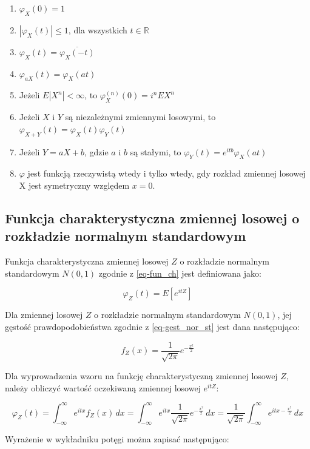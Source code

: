 \documentclass[
  letterpaper,
  DIV=11,
  numbers=noendperiod]{scrreprt}
\begin{document}
\begin{enumerate}
\def\labelenumi{\arabic{enumi}.}
\item
  \(\varphi_X(0) = 1\)
\item
  \(|\varphi_X(t)| \le 1\), dla wszystkich \(t \in \mathbb{R}\)
\item
  \(\varphi_X(t) = \overline{\varphi_X(-t)}\)
\item
  \(\varphi_{aX}(t) = \varphi_X(at)\)
\item
  Jeżeli \(E|X^n| < \infty\), to \(\varphi_{X}^{(n)}(0) = i^nEX^n\)
\item
  Jeżeli \(X\) i \(Y\) są niezależnymi zmiennymi losowymi, to
  \(\varphi_{X+Y}(t) =\varphi_X(t)\varphi_Y(t)\)
\item
  Jeżeli \(Y=aX+b\), gdzie \(a\) i \(b\) są stałymi, to
  \(\varphi_{Y}(t) =e^{itb}\varphi_X(at)\)
\item
  \(\varphi\) jest funkcją rzeczywistą wtedy i tylko wtedy, gdy rozkład
  zmiennej losowej X jest symetryczny względem \(x = 0\).
\end{enumerate}

\subsection{Funkcja charakterystyczna zmiennej losowej o rozkładzie
normalnym
standardowym}\label{funkcja-charakterystyczna-zmiennej-losowej-o-rozkux142adzie-normalnym-standardowym}

Funkcja charakterystyczna zmiennej losowej \(Z\) o rozkładzie normalnym
standardowym \(N(0,1)\) zgodnie z \ref{eq-fun_ch} jest definiowana jako:

\[\varphi_Z(t) = E\left[e^{itZ}\right]\]

Dla zmiennej losowej \(Z\) o rozkładzie normalnym standardowym
\(N(0,1)\), jej gęstość prawdopodobieństwa zgodnie z
\ref{eq-gest_nor_st} jest dana następująco:

\[f_Z(x) = \frac{1}{\sqrt{2\pi}} e^{-\frac{x^2}{2}}\]

Dla wyprowadzenia wzoru na funkcję charakterystyczną zmiennej losowej
\(Z\), należy obliczyć wartość oczekiwaną zmiennej losowej \(e^{itZ}\):

\[\varphi_Z(t) = \int_{-\infty}^{\infty} e^{itx} f_Z(x) \, dx = \int_{-\infty}^{\infty} e^{itx} \frac{1}{\sqrt{2\pi}} e^{-\frac{x^2}{2}} \, dx = \frac{1}{\sqrt{2\pi}}\int_{-\infty}^{\infty}   e^{itx-\frac{x^2}{2}} \, dx\]

Wyrażenie w wykładniku potęgi można zapisać następująco:
\end{document}
